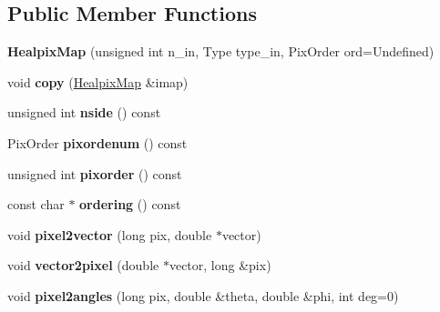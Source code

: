 \subsection*{Public Member Functions}
\begin{DoxyCompactItemize}
\item 
\hypertarget{classHealpixMap_ac02ca9e36dbca7ac8edcc7cb2e85449e}{
{\bfseries HealpixMap} (unsigned int n\_\-in, Type type\_\-in, PixOrder ord=Undefined)}
\label{classHealpixMap_ac02ca9e36dbca7ac8edcc7cb2e85449e}

\item 
\hypertarget{classHealpixMap_a3f393b2626568037439d544704ce082e}{
void {\bfseries copy} (\hyperlink{classHealpixMap}{HealpixMap} \&imap)}
\label{classHealpixMap_a3f393b2626568037439d544704ce082e}

\item 
\hypertarget{classHealpixMap_ade490533245ce6221c376528ec573d7f}{
unsigned int {\bfseries nside} () const }
\label{classHealpixMap_ade490533245ce6221c376528ec573d7f}

\item 
\hypertarget{classHealpixMap_acff1b0924e36b578b9a33883e7dfea07}{
PixOrder {\bfseries pixordenum} () const }
\label{classHealpixMap_acff1b0924e36b578b9a33883e7dfea07}

\item 
\hypertarget{classHealpixMap_a6782e5bafeda70fc53a38f47b6997712}{
unsigned int {\bfseries pixorder} () const }
\label{classHealpixMap_a6782e5bafeda70fc53a38f47b6997712}

\item 
\hypertarget{classHealpixMap_a568fbf2b754dec46b4a8434601ae1c52}{
const char $\ast$ {\bfseries ordering} () const }
\label{classHealpixMap_a568fbf2b754dec46b4a8434601ae1c52}

\item 
\hypertarget{classHealpixMap_acdbb1fd498df2d1b0d93d141523a6103}{
void {\bfseries pixel2vector} (long pix, double $\ast$vector)}
\label{classHealpixMap_acdbb1fd498df2d1b0d93d141523a6103}

\item 
\hypertarget{classHealpixMap_a17db376e6032b0d8f7156f6d0bf434f5}{
void {\bfseries vector2pixel} (double $\ast$vector, long \&pix)}
\label{classHealpixMap_a17db376e6032b0d8f7156f6d0bf434f5}

\item 
\hypertarget{classHealpixMap_a29dd2f8031c4d21b406fd4b835500d8e}{
void {\bfseries pixel2angles} (long pix, double \&theta, double \&phi, int deg=0)}
\label{classHealpixMap_a29dd2f8031c4d21b406fd4b835500d8e}


\end{DoxyCompactItemize}
